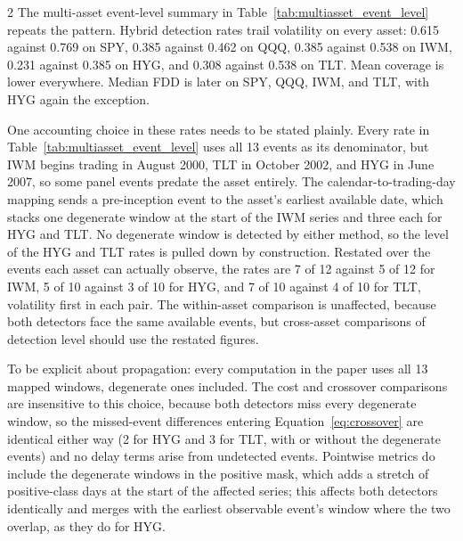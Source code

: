 \documentclass{book}
\makeatletter
\def\my@tag@font{\normalsize}
\let\amsmath@eqref\eqref
\renewcommand\eqref[1]{{\let\my@tag@font\relax\amsmath@eqref{#1}}}
\makeatother
\begin{document}
\begin{multicols}{2}
The multi-asset event-level summary in Table~\ref{tab:multiasset_event_level} repeats the pattern. Hybrid detection rates trail volatility on every asset: 0.615 against 0.769 on SPY, 0.385 against 0.462 on QQQ, 0.385 against 0.538 on IWM, 0.231 against 0.385 on HYG, and 0.308 against 0.538 on TLT. Mean coverage is lower everywhere. Median FDD is later on SPY, QQQ, IWM, and TLT, with HYG again the exception.

One accounting choice in these rates needs to be stated plainly. Every rate in Table~\ref{tab:multiasset_event_level} uses all 13 events as its denominator, but IWM begins trading in August 2000, TLT in October 2002, and HYG in June 2007, so some panel events predate the asset entirely. The calendar-to-trading-day mapping sends a pre-inception event to the asset's earliest available date, which stacks one degenerate window at the start of the IWM series and three each for HYG and TLT. No degenerate window is detected by either method, so the level of the HYG and TLT rates is pulled down by construction. Restated over the events each asset can actually observe, the rates are 7 of 12 against 5 of 12 for IWM, 5 of 10 against 3 of 10 for HYG, and 7 of 10 against 4 of 10 for TLT, volatility first in each pair. The within-asset comparison is unaffected, because both detectors face the same available events, but cross-asset comparisons of detection level should use the restated figures.

To be explicit about propagation: every computation in the paper uses all 13 mapped windows, degenerate ones included. The cost and crossover comparisons are insensitive to this choice, because both detectors miss every degenerate window, so the missed-event differences entering Equation~\eqref{eq:crossover} are identical either way (2 for HYG and 3 for TLT, with or without the degenerate events) and no delay terms arise from undetected events. Pointwise metrics do include the degenerate windows in the positive mask, which adds a stretch of positive-class days at the start of the affected series; this affects both detectors identically and merges with the earliest observable event's window where the two overlap, as they do for HYG.


\end{multicols}
\end{document}
